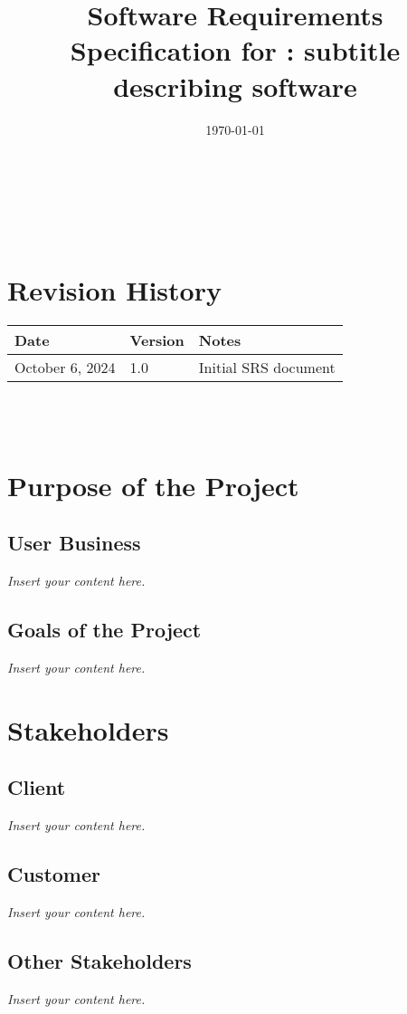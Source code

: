 \documentclass[12pt]{article}
\newcommand{\lips}{\textit{Insert your content here.}}
\begin{document}
\title{Software Requirements Specification for \progname: subtitle describing software} 
\author{\authname}
\date{\today}
	
\maketitle

~\newpage


\tableofcontents

~\newpage

\section*{Revision History}

\begin{tabularx}{\textwidth}{p{3cm}p{2cm}X}
\toprule {\textbf{Date}} & {\textbf{Version}} & {\textbf{Notes}}\\
\midrule
October 6, 2024 & 1.0 & Initial SRS document\\
\bottomrule
\end{tabularx}

~\\

~\newpage
\section{Purpose of the Project}
\subsection{User Business}
\lips
\subsection{Goals of the Project}
\lips
\section{Stakeholders}
\subsection{Client}
\lips
\subsection{Customer}
\lips
\subsection{Other Stakeholders}
\lips
\end{document}
